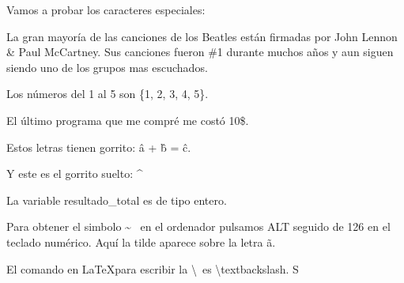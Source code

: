 \documentclass{article}
\begin{document}
Vamos a probar los caracteres especiales:

La gran mayoría de las canciones de los Beatles están firmadas por 
John Lennon \& Paul McCartney. Sus canciones fueron \#1 durante muchos años 
y aun siguen siendo uno de los grupos mas escuchados.

Los números del 1 al 5 son \{1, 2, 3, 4, 5\}.

El último programa que me compré me costó 10\$.

Estos letras tienen gorrito: \^a + \^b = \^c. 

Y este es el gorrito suelto: \^~

La variable resultado\_total es de tipo entero.

Para obtener el simbolo \~~ en el ordenador pulsamos ALT seguido de 126 
en el teclado numérico. Aquí la tilde aparece sobre la letra \~a.

El comando en \LaTeX para escribir la \textbackslash  ~es \textbackslash textbackslash. 
\raisebox{-0.5ex}{\~}S
\end{document}
